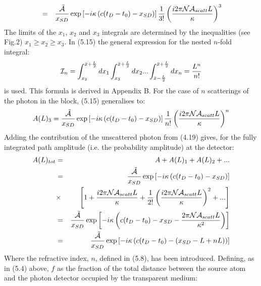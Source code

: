 {\begin{eqnarray}
     & = & \frac{\tilde{{\cal A}}}{x_{SD}}
     \exp\left[ - i \kappa\left(c(t_D-t_0)-x_{SD}\right)\right]
     \frac{1}{3!} \left(\frac{i 2 \pi {\cal N}{\cal A}_{scatt} L}{\kappa}\right)^3  
 \end{eqnarray}
  The limits of the $x_1$, $x_2$ and $x_3$ integrals are determined by the inequalities
  (see Fig.2) $x_1 \ge x_2 \ge x_3$. In (5.15) the general expression for the 
  nested $n$-fold integral: 
  \begin{equation}
  {\cal I}_n =   \int_{x_2}^{\bar{x} +\frac{L}{2}} d x_1  \int_{x_3}^{\bar{x} +\frac{L}{2}} d x_2
   ...\int_{\bar{x} -\frac{L}{2}}^{\bar{x} +\frac{L}{2}} d x_n = \frac{L^n}{n!}
   \end{equation}
   is used. This formula is derived in Appendix B.
   For the case of $n$ scatterings of the photon in the block, (5.15) generalises to:
   \begin{equation}
     A(L)_3  =  \frac{\tilde{{\cal A}}}{x_{SD}}
   \exp\left[ - i \kappa\left(c(t_D-t_0)-x_{SD}\right)\right]
    \frac{1}{n!} \left(\frac{i 2 \pi {\cal N}{\cal A}_{scatt} L}{\kappa}\right)^n 
   \end{equation}
    Adding the contribution of the unscattered photon from (4.19) gives, for the fully integrated
    path amplitude (i.e. the probability amplitude) at the detector:
   \begin{eqnarray}
      A(L)_{tot} & = & A +  A(L)_1 +  A(L)_2 + ...  \nonumber \\
          &  = & \frac{\tilde{{\cal A}}}{x_{SD}}
   \exp\left[ - i \kappa\left(c(t_D-t_0)-x_{SD}\right)\right] \nonumber \\
        & \times & \left[ 1+\frac{i 2 \pi {\cal N}{\cal A}_{scatt} L}{\kappa}
        +  \frac{1}{2!} \left(\frac{i 2 \pi {\cal N}{\cal A}_{scatt} L}{\kappa}\right)^2 
         +...\right]  \nonumber \\
    & = & \frac{\tilde{{\cal A}}}{x_{SD}}
   \exp \left[ - i \kappa\left(c(t_D-t_0)-x_{SD}-\frac{2 \pi {\cal N}{\cal A}_{scatt} L}{\kappa^2}
    \right)\right] \nonumber \\
    & = & \frac{\tilde{{\cal A}}}{x_{SD}}
   \exp  \left[ - i \kappa\left(c(t_D-t_0)-(x_{SD}-L+nL)\right)\right]  
   \end{eqnarray}
    Where the refractive index, $n$, defined in (5.8), has been introduced. Defining, as in
    (5.4) above, $f$ as the fraction of the total distance between the source atom and the
    photon detector occupied by the transparent medium:
  \begin{equation}

\end{equation}}
